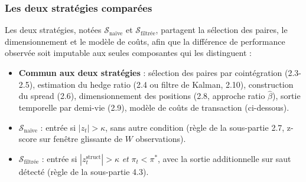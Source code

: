 \documentclass{article}
\begin{document}
\subsubsection*{Les deux stratégies comparées}
Les deux stratégies, notées $\mathcal{S}_{\text{naïve}}$ et $\mathcal{S}_{\text{filtrée}}$, partagent la sélection des paires, le dimensionnement et le modèle de coûts, afin que la différence de performance observée soit imputable aux seules composantes qui les distinguent :
\begin{itemize}
\item \textbf{Commun aux deux stratégies} : sélection des paires par cointégration (2.3-2.5), estimation du hedge ratio (2.4 ou filtre de Kalman, 2.10), construction du spread (2.6), dimensionnement des positions (2.8, approche ratio $\hat\beta$), sortie temporelle par demi-vie (2.9), modèle de coûts de transaction (ci-dessous).
\item $\mathcal{S}_{\text{naïve}}$ : entrée si $|z_t|>\kappa$, sans autre condition (règle de la sous-partie 2.7, z-score sur fenêtre glissante de $W$ observations).
\item $\mathcal{S}_{\text{filtrée}}$ : entrée si $|z_t^{\text{struct}}|>\kappa$ \emph{et} $\pi_t<\pi^\ast$, avec la sortie additionnelle sur saut détecté (règle de la sous-partie 4.3).
\end{itemize}
\end{document}

